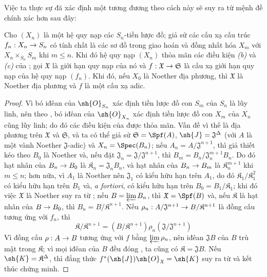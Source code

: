 \documentclass[oneside]{amsart}
\makeatletter
\renewcommand{\leq}{\leqslant}
\newcommand{\ega@arrow}[2]{\mathchoice{#1}{#2}{#2}{#2}}
\renewcommand{\to}{\ega@arrow{\longrightarrow}{\rightarrow}}
\let\EGAOriginalLabel\label
\renewcommand{\label}[1]{\phantomsection\EGAOriginalLabel{#1}}
\makeatother
\begin{document}
Việc ta thực sự đã xác định một tương đương theo cách này sẽ suy ra từ mệnh đề chính xác hơn sau đây:

\begin{proposition}[10.12.3.1]
\label{I.10.12.3.1}
Cho $(X_n)$ là một hệ quy nạp các $S_n$-tiền lược đồ;
giả sử các cấu xạ cấu trúc $f_n:X_n\to S_n$ có tính chất là các sơ đồ trong  giao hoán và đồng nhất hóa $X_m$ với $X_n\times_{S_n}S_m$ khi $m\leq n$.
Khi đó hệ quy nạp $(X_n)$ thỏa mãn các điều kiện \emph{(b)} và \emph{(c)} của ;
gọi $\mathfrak{X}$ là giới hạn quy nạp của nó và $f:\mathfrak{X}\to\mathfrak{S}$ là cấu xạ giới hạn quy nạp của hệ quy nạp $(f_n)$.
Khi đó, nếu $X_0$ là Noether địa phương, thì $\mathfrak{X}$ là Noether địa phương và $f$ là một cấu xạ adic.
\end{proposition}

\begin{proof}
Vì bó iđêan của $\sh{O}_{S_n}$ xác định tiền lược đồ con $S_m$ của $S_n$ là lũy linh, nên theo , bó iđêan của $\sh{O}_{X_n}$ xác định tiền lược đồ con $X_m$ của $X_n$ cũng lũy linh; do đó các điều kiện của  được thỏa mãn.
Vấn đề vì thế là địa phương trên $\mathfrak{X}$ và $\mathfrak{S}$, và ta có thể giả sử $\mathfrak{S}=\Spf(A)$, $\sh{J}=\mathfrak{J}^\Delta$ (với $A$ là một vành Noether $\mathfrak{J}$-adic) và $X_n=\Spec(B_n)$;
nếu $A_n=A/\mathfrak{J}^{n+1}$, thì giả thiết kéo theo $B_0$ là Noether và, nếu đặt $\mathfrak{J}_n=\mathfrak{J}/\mathfrak{J}^{n+1}$, thì $B_m=B_n/\mathfrak{J}_n^{m+1}B_n$.
Do đó hạt nhân của $B_n\to B_0$ là $\mathfrak{K}_n=\mathfrak{J}_nB_n$, và hạt nhân của $B_n\to B_m$ là $\mathfrak{K}_n^{m+1}$ khi $m\leq n$;
hơn nữa, vì $A_1$ là Noether nên $\mathfrak{J}_1$ có kiểu hữu hạn trên $A_1$, do đó $\mathfrak{K}_1/\mathfrak{K}_1^2$ có kiểu hữu hạn trên $B_1$ và, \emph{a fortiori}, có kiểu hữu hạn trên $B_0=B_1/\mathfrak{K}_1$;
khi đó việc $\mathfrak{X}$ là Noether suy ra từ ;
nếu $B=\varprojlim B_n$, thì $\mathfrak{X}=\Spf(B)$ và, nếu $\mathfrak{K}$ là hạt nhân của $B\to B_0$, thì $B_n=B/\mathfrak{K}^{n+1}$.
Nếu $\rho_n:A/\mathfrak{J}^{n+1}\to B/\mathfrak{K}^{n+1}$ là đồng cấu tương ứng với $f_n$, thì
\[
    \mathfrak{K}/\mathfrak{K}^{n+1} = (B/\mathfrak{K}^{n+1})\rho_n(\mathfrak{J}/\mathfrak{J}^{n+1})
\]
Vì đồng cấu $\rho:A\to B$ tương ứng với $f$ bằng $\varprojlim\rho_n$, nên iđêan $\mathfrak{J}B$ của $B$ trù mật trong $\mathfrak{K}$; vì mọi iđêan của $B$ đều đóng , ta cũng có $\mathfrak{K}=\mathfrak{J}B$.
Nếu $\sh{K}=\mathfrak{K}^\Delta$, thì đẳng thức $f^*(\sh{J})\sh{O}_\mathfrak{X}=\sh{K}$ suy ra từ  và kết thúc chứng minh.
\end{proof}
\end{document}
